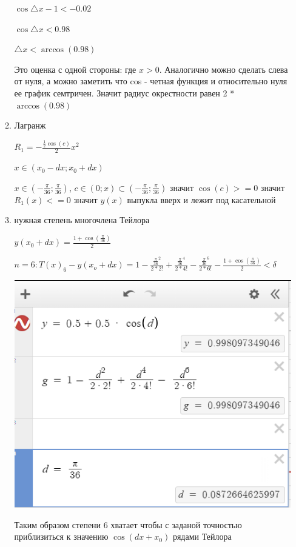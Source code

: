 \begin{enumerate}
\begin{enumerate}
        $\displaystyle \cos \triangle x - 1 < -0.02$

        $\displaystyle \cos \triangle x < 0.98$

        $\displaystyle \triangle x < \arccos (0.98)$

        Это оценка с одной стороны: где $x > 0$.
        Аналогично можно сделать слева от нуля, а можно заметить что cos - четная функция и относительно нуля ее график семтричен. Значит радиус окрестности равен 2 * $\arccos(0.98)$

        \item Лагранж

        $\displaystyle R_1 = -\frac{\frac{1}{2}\cos (c)}{2}x^2$

        $\displaystyle x \in (x_0 -dx; x_0 + dx)$

        $\displaystyle x \in \left(-\frac{\pi}{36}; \frac{\pi}{36}\right)$, $c \in (0; x) \subset \left(-\frac{\pi}{36}; \frac{\pi}{36}\right)$ значит $\cos(c) >= 0$ значит $R_1(x) <= 0$ значит $y(x)$ выпукла вверх и лежит под касательной

        \item нужная степень многочлена Тейлора

        $\displaystyle y(x_0 + dx) = \frac{1 + \cos\left(\frac{\pi}{36}\right)}{2}$

        $\displaystyle n = 6: T(x)_6 - y(x_o + dx) = 1 - \frac{{\frac{\pi}{36}}^2}{2 * 2!} + \frac{{\frac{\pi}{36}}^4}{2 * 4!} - \frac{{\frac{\pi}{36}}^6}{2 * 6!} - \frac{1 + \cos \left(\frac{\pi}{36}\right)}{2} < \delta$

        \includegraphics[width=0.55\linewidth]{images/2_check.png}

        Таким образом степени 6 хватает чтобы с заданой точностью приблизиться к значению $\cos(dx + x_0)$ рядами Тейлора

    \end{enumerate}


\end{enumerate}
